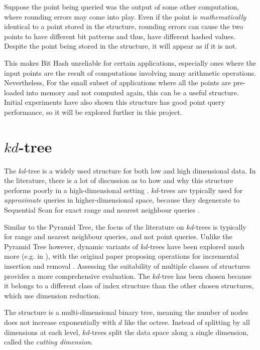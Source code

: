 Suppose the point being queried was the output of some other computation, where rounding errors may come into play. Even if the point is \textit{mathematically} identical to a point stored in the structure, rounding errors can cause the two points to have different bit patterns and thus, have different hashed values.  Despite the point being stored in the structure, it will appear as if it is not. 

This makes Bit Hash unreliable for certain applications, especially ones where the input points are the result of computations involving many arithmetic operations. Nevertheless, For the small subset of applications where all the points are pre-loaded into memory and not computed again, this can be a useful structure. Initial experiments have also shown this structure has good point query performance, so it will be explored further in this project.

\section{$kd$-tree}
\label{sec:kd-tree-detail}

The $kd$-tree is a widely used structure for both low and high dimensional data. In the literature, there is a lot of discussion as to how and why this structure performs poorly in a high-dimensional setting \cite{highd-nn, search-highd-analysis}. $kd$-trees are typically used for \textit{approximate} queries in higher-dimensional space, because they degenerate to Sequential Scan for exact range and nearest neighbour queries \cite{similarity-searching}. 

Similar to the Pyramid Tree, the focus of the literature on $kd$-trees is typically for range and nearest neighbour queries, and not point queries. Unlike the Pyramid Tree however, dynamic variants of $kd$-trees have been explored much more (e.g. in \cite{bkd-tree, kdb-tree}), with the original paper proposing operations for incremental insertion and removal \cite{kd-tree}. Assessing the suitability of multiple classes of structures provides a more comprehensive evaluation. The $kd$-tree has been chosen because it belongs to a different class of index structure than the other chosen structures, which use dimension reduction.

The structure is a multi-dimensional binary tree, meaning the number of nodes does not increase exponentially with $d$ like the octree. Instead of splitting by all dimensions at each level, $kd$-trees split the data space along a single dimension, called the \textit{cutting dimension}.

